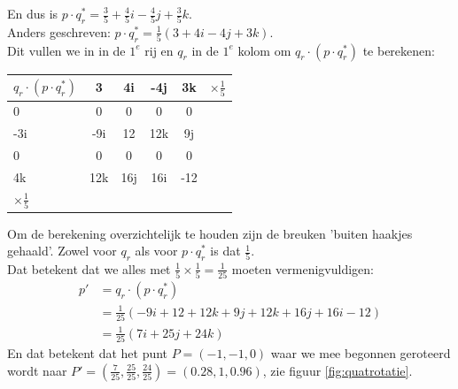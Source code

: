 En dus is $ p\cdot q^*_r = \frac{3}{5}  + \frac{4}{5}i - \frac{4}{5}j  + \frac{3}{5}k $. \\
Anders geschreven:  $ p\cdot q^*_r = \frac{1}{5}  (3 + 4i - 4j  + 3k) $. \\
Dit vullen we  in in de $ 1^e $ rij en $ q_r $ in de $ 1^e  $ kolom om $ q_r\cdot (p\cdot q^*_r) $ te berekenen:\\
\begin{center}
	\begin{tabular}{ | l || c | c |c |c |l}
		\hline
		$ q_r\cdot (p\cdot q^*_r) $  & 3 & 4i   & -4j & 3k &  $ \times  \frac{1}{5} $\\ \hline \hline
		0                         & 0    & 0    & 0       & 0 & \\ \hline
		-3i                      & -9i   & 12  & 12k    & 9j & \\ \hline
		0                         & 0    &  0   & 0       & 0&\\ \hline
		4k                       & 12k & 16j  & 16i   & -12 & \\ 
		\hline 
		$ \times  \frac{1}{5} $
	\end{tabular}
\end{center}
Om de berekening overzichtelijk te houden zijn de breuken 'buiten haakjes gehaald'. Zowel voor $ q_r $ als voor $ p\cdot q^*_r $ is dat $  \frac{1}{5} $. \\
Dat betekent dat we alles met $  \frac{1}{5} \times  \frac{1}{5}  =  \frac{1}{25} $ moeten vermenigvuldigen: 
\begin{align*}
    p' &=  q_r\cdot (p\cdot q^*_r)  \\
       &=  \frac{1}{25}(-9i + 12 +12k + 9j + 12k + 16j + 16i -  12)  \\
       & = \frac{1}{25} (7i + 25j +  24k  )
\end{align*}
En dat betekent dat het punt $ P=(-1,-1,0)  $ waar we mee begonnen  geroteerd wordt naar $ P'=  (\frac{7}{25}, \frac{25}{25}, \frac{24}{25}) =(0.28,1,0.96)  $, zie  figuur \ref{fig:quatrotatie}.


\newpage
